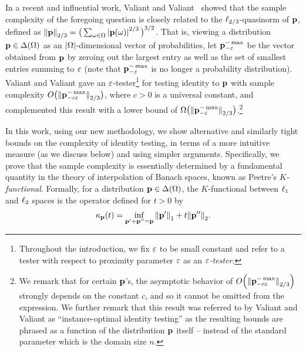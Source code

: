 In a recent and influential work, Valiant and Valiant~\cite{VV:14} showed that the sample complexity of the foregoing question is closely related to the $\lp[2/3]$-quasinorm of $\p$, defined as $\norm{\p}_{2/3} = \big(\sum_{\omega \in \Omega} \abs{\p(\omega)}^{2/3}\big)^{3/2}$. That is, viewing a distribution $\p \in\distribs{\Omega}$ as an $\abs{\Omega}$-dimensional vector of probabilities, let $\p_{-\eps}^{-\max}$ be the vector obtained from $\p$ by zeroing out the largest entry as well as the set of smallest entries summing to $\eps$ (note that $\p_{-\eps}^{-\max}$ is no longer a probability distribution). Valiant and Valiant gave an $\eps$-tester\footnote{Throughout the introduction, we fix $\eps$ to be small constant and refer to a tester with respect to proximity parameter $\eps$ as an \emph{$\eps$-tester}.}{} for testing identity to $\p$ with sample complexity $O\big({\norm{\p_{-c \eps}^{-\max}}_{2/3}}\big)$, where $c>0$ is a universal constant, and complemented this result with a lower bound of $\Omega\big({\norm{\p_{-\eps}^{-\max}}_{2/3}}\big)$.\footnote{We remark that for certain $\p$'s, the asymptotic behavior of $\bigO{\norm{\p_{-c\eps}^{-\max}}_{2/3}}$ strongly depends on the constant $c$, and so it cannot be omitted from the expression. We further remark that this result was referred to by Valiant and Valiant  as ``instance-optimal identity testing'' as the resulting bounds are phrased as a function of the distribution $\p$ itself -- instead of the standard parameter which is the domain size $n$.}

In this work, using our new methodology, we show alternative and similarly tight bounds on the complexity of identity testing, in terms of a more intuitive measure (as we discuss below) and using simpler arguments. Specifically, we prove that the sample complexity is essentially determined by a fundamental quantity in the theory of interpolation of Banach spaces, known as Peetre's \emph{$K$-functional}. Formally, for a distribution $\p\in\distribs{\Omega}$, the $K$-functional between $\lp[1]$ and $\lp[2]$ spaces is the operator defined for $t>0$ by
\begin{equation*}
    \kf{\p}(t) = \inf_{\p'+ \p''=\p} \normone{\p'} + t\normtwo{\p''}.
\end{equation*}

